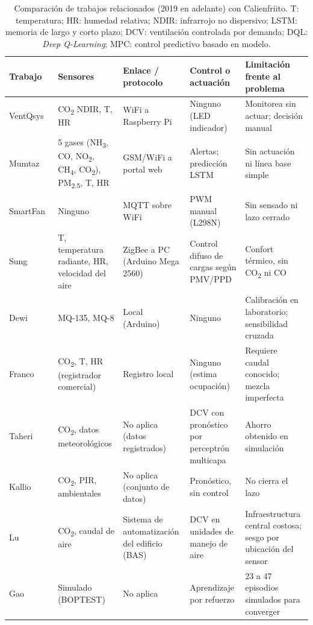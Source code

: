 \documentclass[manuscript,screen,nonacm,natbib=false]{acmart}
\newcommand{\COdos}{CO\textsubscript{2}}
\begin{document}
\begin{table}[htbp]
\caption{Comparación de trabajos relacionados (2019 en adelante) con Calienfriito. T: temperatura; HR: humedad relativa; NDIR: infrarrojo no dispersivo; LSTM: memoria de largo y corto plazo; DCV: ventilación controlada por demanda; DQL: \textit{Deep Q-Learning}; MPC: control predictivo basado en modelo.}
\label{tab:sota}
\footnotesize
\begin{tabularx}{\linewidth}{@{}P{2.1cm} Y P{2.3cm} Y Y@{}}
\toprule
Trabajo & Sensores & Enlace / protocolo & Control o actuación & Limitación frente al problema \\
\midrule
VentQsys~\cite{fayos2021ventqsys} & \COdos{} NDIR, T, HR & WiFi a Raspberry Pi & Ninguno (LED indicador) & Monitorea sin actuar; decisión manual \\
Mumtaz~\cite{mumtaz2021iot} & 5 gases (NH\textsubscript{3}, CO, NO\textsubscript{2}, CH\textsubscript{4}, \COdos{}), PM\textsubscript{2.5}, T, HR & GSM/WiFi a portal web & Alertas; predicción LSTM & Sin actuación ni línea base simple \\
SmartFan~\cite{niamah2026esp32} & Ninguno & MQTT sobre WiFi & PWM manual (L298N) & Sin sensado ni lazo cerrado \\
Sung~\cite{sung2020thermal} & T, temperatura radiante, HR, velocidad del aire & ZigBee a PC (Arduino Mega 2560) & Control difuso de cargas según PMV/PPD & Confort térmico, sin \COdos{} ni CO \\
Dewi~\cite{dewi2025mq135} & MQ-135, MQ-8 & Local (Arduino) & Ninguno & Calibración en laboratorio; sensibilidad cruzada \\
Franco~\cite{franco2020co2} & \COdos{}, T, HR (registrador comercial) & Registro local & Ninguno (estima ocupación) & Requiere caudal conocido; mezcla imperfecta \\
Taheri~\cite{taheri2021learning} & \COdos{}, datos meteorológicos & No aplica (datos registrados) & DCV con pronóstico por perceptrón multicapa & Ahorro obtenido en simulación \\
Kallio~\cite{kallio2021forecasting} & \COdos{}, PIR, ambientales & No aplica (conjunto de datos) & Pronóstico, sin control & No cierra el lazo \\
Lu~\cite{lu2022dcv} & \COdos{}, caudal de aire & Sistema de automatización del edificio (BAS) & DCV en unidades de manejo de aire & Infraestructura central costosa; sesgo por ubicación del sensor \\
Gao~\cite{gao2023comparative} & Simulado (BOPTEST) & No aplica & Aprendizaje por refuerzo & 23 a 47 episodios simulados para converger \\

\end{tabularx}
\end{table}
\end{document}
